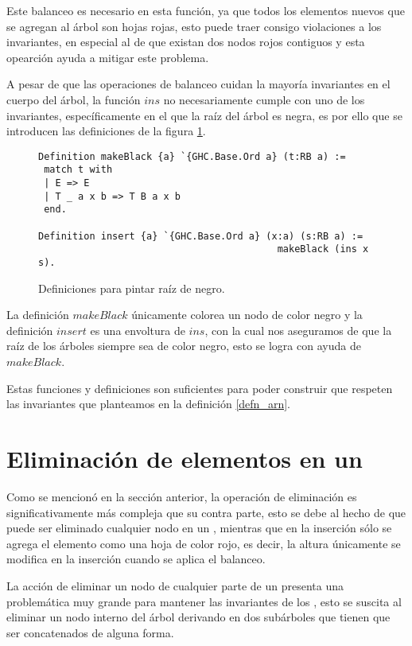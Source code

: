 Este balanceo es necesario en esta funci\'on, ya que todos los elementos nuevos que se agregan al 
\'arbol son hojas rojas, esto puede traer consigo violaciones a los invariantes, en especial al de
que existan dos nodos rojos contiguos y esta opearci\'on ayuda a mitigar este problema.

A pesar de que las operaciones de balanceo cuidan la mayoría invariantes en el cuerpo del \'arbol,
la función $ins$ no necesariamente cumple con uno de los invariantes, espec\'ificamente en el que la
raíz del árbol es negra, es por ello que se introducen las definiciones de la figura 
\ref{raiz_negra_func}.

\begin{figure}[!ht]
\centering
\captionsetup{justification=centering}
\begin{verbatim}
Definition makeBlack {a} `{GHC.Base.Ord a} (t:RB a) :=
 match t with
 | E => E
 | T _ a x b => T B a x b
 end.

Definition insert {a} `{GHC.Base.Ord a} (x:a) (s:RB a) :=
                                          makeBlack (ins x s).
\end{verbatim}
\caption{Definiciones para pintar ra\'iz de negro.}
\label{raiz_negra_func}
\end{figure}

La definici\'on $makeBlack$ únicamente colorea un nodo de color negro y la definición
$insert$ es una envoltura de $ins$, con la cual nos aseguramos de que la ra\'iz de los \'arboles
siempre sea de color negro, esto se logra con ayuda de $makeBlack$.

Estas funciones y definiciones son suficientes para poder construir {\arns} que respeten las
invariantes que planteamos en la definici\'on \ref{defn_arn}.

\section{Eliminación de elementos en un {\arn}}

Como se mencion\'o en la secci\'on anterior, la operaci\'on de eliminaci\'on es significativamente 
m\'as compleja que su contra parte, esto se debe al hecho de que puede ser eliminado cualquier 
nodo en un {\arn}, mientras que en la inserci\'on s\'olo se agrega el elemento como una hoja de color rojo, es decir,
la altura \'unicamente se modifica en la inserción cuando se aplica el balanceo.

La acci\'on de eliminar un nodo de cualquier parte de un {\arn} presenta una problemática muy grande 
para mantener las invariantes de los {\arns}, esto se suscita al eliminar un nodo interno del \'arbol derivando en dos subárboles que tienen que ser concatenados de alguna forma.

